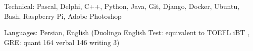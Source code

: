 

\begin{cvskills}

  \cvskill
    {Technical:}
    {Pascal, Delphi, C++, Python, Java, Git, Django, Docker, Ubuntu, Bash, Raspberry Pi, Adobe Photoshop}




  \cvskill
    {Languages:}
    {Persian, English (Duolingo English Test:  equivalent to TOEFL iBT  , GRE: quant 164 verbal 146 writing 3)} %

\end{cvskills}

